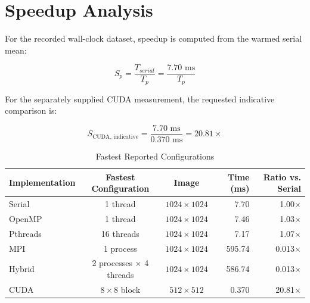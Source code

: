 \documentclass[12pt,a4paper]{report}
\begin{document}
\section{Speedup Analysis}

For the recorded wall-clock dataset, speedup is computed from the warmed serial mean:

\begin{equation}
S_p = \frac{T_{serial}}{T_p} = \frac{7.70 \text{ ms}}{T_p}
\end{equation}

For the separately supplied CUDA measurement, the requested indicative comparison is:

\begin{equation}
S_{\text{CUDA, indicative}} = \frac{7.70 \text{ ms}}{0.370 \text{ ms}} = 20.81\times
\end{equation}

\begin{table}[H]
    \centering
    \footnotesize
    \begin{tabular}{|l|c|c|r|r|}
    \hline
    \textbf{Implementation} & \textbf{Fastest Configuration} & \textbf{Image} & \textbf{Time (ms)} & \textbf{Ratio vs. Serial} \\
    \hline
    Serial & 1 thread & $1024 \times 1024$ & 7.70 & 1.00$\times$ \\
    OpenMP & 1 thread & $1024 \times 1024$ & 7.46 & 1.03$\times$ \\
    Pthreads & 16 threads & $1024 \times 1024$ & 7.17 & 1.07$\times$ \\
    MPI & 1 process & $1024 \times 1024$ & 595.74 & 0.013$\times$ \\
    Hybrid & 2 processes $\times$ 4 threads & $1024 \times 1024$ & 586.74 & 0.013$\times$ \\
    CUDA & $8 \times 8$ block & $512 \times 512$ & 0.370 & 20.81$\times$ \\
    \hline
    \end{tabular}
    \caption{Fastest Reported Configurations}
\end{table}
\end{document}
